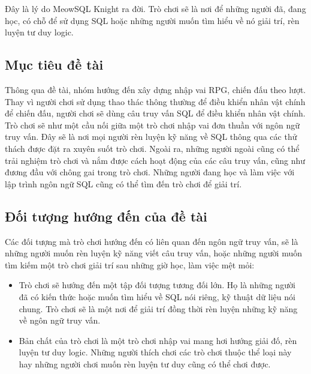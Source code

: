 \hspace*{0.5cm} Đây là lý do MeowSQL Knight ra đời. Trò chơi sẽ là nơi để những người đã, đang học, có chỗ để sử dụng SQL hoặc những người muốn tìm hiểu về nó giải trí, rèn luyện tư duy logic.
\subsection{Mục tiêu đề tài}
Thông qua đề tài, nhóm hướng đến xây dựng nhập vai RPG, chiến đấu theo lượt. Thay vì người chơi sử dụng thao thác thông thường để điều khiển nhân vật chính để chiến đấu, người chơi sẽ dùng câu truy vấn SQL để điều khiển nhân vật chính.\\
Trò chơi sẽ như một cầu nối giữa một trò chơi nhập vai đơn thuần với ngôn ngữ truy vấn.
Đây sẽ là nơi mọi người rèn luyện kỹ năng về SQL thông qua các thử thách được đặt ra xuyên suốt trò chơi. Ngoài ra, những người ngoài cũng có thể trải nghiệm trò chơi và nắm được cách hoạt động của các câu truy vấn, cũng như đương đầu với chông gai trong trò chơi. Những người đang học và làm việc với lập trình ngôn ngữ SQL cũng có thể tìm đến trò chơi để giải trí.
\subsection{Đối tượng hướng đến của đề tài}


\hspace*{0.5cm} Các đối tượng mà trò chơi hướng đến có liên quan đến ngôn ngữ truy vấn, sẽ là những người muốn rèn luyện kỹ năng viết câu truy vấn, hoặc những người muốn tìm kiếm một trò chơi giải trí sau những giờ học, làm việc mệt mỏi:
\begin{itemize}
	\item Trò chơi sẽ hướng đến một tập đối tượng tương đối lớn. Họ là những người đã có kiến thức hoặc muốn tìm hiểu về SQL nói riêng, kỹ thuật dữ liệu nói chung. Trò chơi sẽ là một nơi để giải trí đồng thời rèn luyện những kỹ năng về ngôn ngữ truy vấn.
	\item Bản chất của trò chơi là một trò chơi nhập vai mang hơi hướng giải đố, rèn luyện tư duy logic. Những người thích chơi các trò chơi thuộc thể loại này hay những người chơi muốn rèn luyện tư duy cũng có thể chơi được.
\end{itemize}
